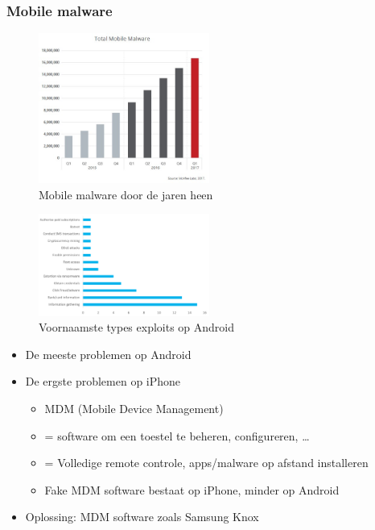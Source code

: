 \documentclass{article}
\begin{document}
\subsubsection{Mobile malware}

\begin{figure}[H]
    \centering
    \includegraphics[width=0.5\textwidth]{mobile-malware.jpg}
    \caption{Mobile malware door de jaren heen}
\end{figure}

\begin{figure}[H]
    \centering
    \includegraphics[width=0.5\textwidth]{mobile-malware-types.png}
    \caption{Voornaamste types exploits op Android}
\end{figure}

\begin{itemize}
    \item De meeste problemen op Android
    \item De ergste problemen op iPhone
    \begin{itemize}
        \item MDM (Mobile Device Management)
        \item = software om een toestel te beheren, configureren, \dots
        \item = Volledige remote controle, apps/malware op afstand installeren
        \item Fake MDM software bestaat op iPhone, minder op Android
    \end{itemize}
    \item Oplossing: MDM software zoals Samsung Knox
\end{itemize}
\end{document}
